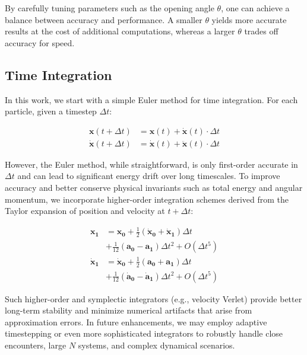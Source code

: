 \documentclass[a4paper, 12pt, oneside, onecolumn]{article}
\begin{document}
\begin{multicols}{2}
By carefully tuning parameters such as the opening angle $\theta$, one can achieve a balance between accuracy and performance. A smaller $\theta$ yields more accurate results at the cost of additional computations, whereas a larger $\theta$ trades off accuracy for speed.





\subsection{Time Integration}

In this work, we start with a simple Euler method for time integration. For each particle, given a timestep $\Delta t$:

\begin{align}
	\mathbf{x}(t + \Delta t)
	&= \mathbf{x}(t) + \mathbf{\dot{x}}(t) \cdot \Delta t \\
	\mathbf{\dot{x}}(t + \Delta t)
	&= \mathbf{\dot{x}}(t) + \mathbf{\ddot{x}}(t) \cdot \Delta t
\end{align}

However, the Euler method, while straightforward, is only first-order accurate in $\Delta t$ and can lead to significant energy drift over long timescales. To improve accuracy and better conserve physical invariants such as total energy and angular momentum, we incorporate higher-order integration schemes derived from the Taylor expansion of position and velocity at $t + \Delta t$:

\begin{align}
	\mathbf{x_1} \nonumber
	&= \mathbf{x_0} + \frac{1}{2}\left(\mathbf{\dot{x}_0} + \mathbf{\dot{x}_1}\right)\Delta t \\
	&+ \frac{1}{12}\left(\mathbf{a_0} - \mathbf{a_1}\right)\Delta t^2+ O\left(\Delta t^5\right) \\
	\mathbf{\dot{x}_1} \nonumber
	&= \mathbf{\dot{x}_0} + \frac{1}{2}\left(\mathbf{a_0} + \mathbf{a_1}\right)\Delta t \\
	&+ \frac{1}{12}\left(\mathbf{\dot{a}_0} - \mathbf{\dot{a}_1}\right)\Delta t^2 + O\left(\Delta t^5\right)
\end{align}

Such higher-order and symplectic integrators (e.g., velocity Verlet) provide better long-term stability and minimize numerical artifacts that arise from approximation errors. In future enhancements, we may employ adaptive timestepping or even more sophisticated integrators to robustly handle close encounters, large $N$ systems, and complex dynamical scenarios.





\end{multicols}
\end{document}
